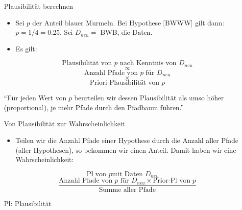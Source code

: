 \documentclass[
  ngerman,
  ignorenonframetext,
]{beamer}
\providecommand{\tightlist}{%
  \setlength{\itemsep}{0pt}\setlength{\parskip}{0pt}}
\begin{document}
\begin{frame}{Plausibilität berechnen}
\protect\hypertarget{plausibilituxe4t-berechnen}{}
\begin{itemize}
\item
  Sei \(p\) der Anteil blauer Murmeln. Bei Hypothese {[}BWWW{]} gilt
  dann: \(p=1/4 = 0.25\). Sei \(D_{neu} =\) BWB, die Daten.
\item
  Es gilt:
\end{itemize}

\[\text{Plausibilität von }p\text{ nach Kenntnis von }D_{neu}\]
\[\propto\] \[\text{Anzahl Pfade von }p\text{ für }D_{neu}\] \[\times\]
\[\text{Priori-Plausibilität von }p\]

``Für jeden Wert von \(p\) beurteilen wir dessen Plausibilität als umso
höher (proportional), je mehr Pfade durch den Pfadbaum führen.''
\end{frame}

\begin{frame}{Von Plausibilität zur Wahrscheinlichkeit}
\protect\hypertarget{von-plausibilituxe4t-zur-wahrscheinlichkeit}{}
\begin{itemize}
\tightlist
\item
  Teilen wir die Anzahl Pfade einer Hypothese durch die Anzahl aller
  Pfade (aller Hypothesen), so bekommen wir einen Anteil. Damit haben
  wir eine Wahrscheinlichkeit:
\end{itemize}

\[\text{Pl von }p\text{mit Daten }D_{neu} =\]
\[\frac{\text{Anzahl Pfade von }p\text{ für }D_{neu}\times \text{Prior-Pl von }p}{\text{Summe aller Pfade}}\]

Pl: Plausibilität
\end{frame}
\end{document}
